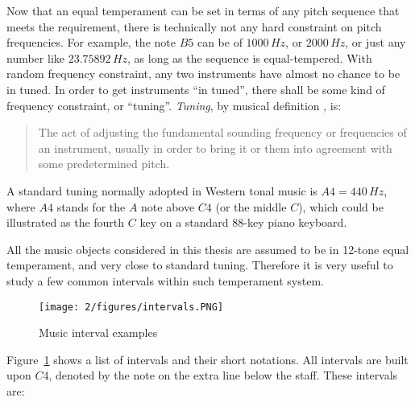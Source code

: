 Now that an equal temperament can be set in terms of any pitch sequence that meets the requirement, there is technically not any hard constraint on pitch frequencies. For example, the note $B5$ can be of $1000\,Hz$, or $2000\,Hz$, or just any number like $23.75892\,Hz$, as long as the sequence is equal-tempered. With random frequency constraint, any two instruments have almost no chance to be in tuned. In order to get instruments ``in tuned'', there shall be some kind of frequency constraint, or ``tuning''. {\it Tuning}, by musical definition \cite{randel1999harvard}, is:
\begin{quote}
The act of adjusting the fundamental sounding frequency or frequencies of an instrument, usually in order to bring it or them into agreement with some predetermined pitch.
\end{quote}
A standard tuning normally adopted in Western tonal music is $A4 = 440\,Hz$, where $A4$ stands for the $A$ note above $C4$ (or the middle $C$), which could be illustrated as the fourth $C$ key on a standard 88-key piano keyboard.

All the music objects considered in this thesis are assumed to be in 12-tone equal temperament, and very close to standard tuning. Therefore it is very useful to study a few common intervals within such temperament system.

\begin{figure}[htb]
\centering
\texttt{[image: 2/figures/intervals.PNG]}
\caption{Music interval examples}
\label{fig:2-mi}
\end{figure}

Figure~\ref{fig:2-mi} shows a list of intervals and their short notations. All intervals are built upon $C4$, denoted by the note on the extra line below the staff. These intervals are:


